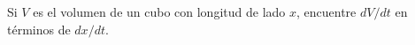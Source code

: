 \item Si $V$ es el volumen de un cubo con longitud de lado $x$, encuentre $dV/dt$ en términos de $dx/dt$.
